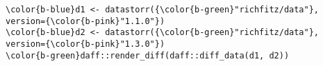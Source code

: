 \documentclass[class=minimal,border=0]{standalone}
\begin{document}
%
\begin{BVerbatim}[bgcolor=b-darkgrey]
\color{b-blue}d1 <- datastorr({\color{b-green}"richfitz/data"}, version={\color{b-pink}"1.1.0"})
\color{b-blue}d2 <- datastorr({\color{b-green}"richfitz/data"}, version={\color{b-pink}"1.3.0"})
\color{b-green}daff::render_diff(daff::diff_data(d1, d2))
\end{BVerbatim}
\end{document}
